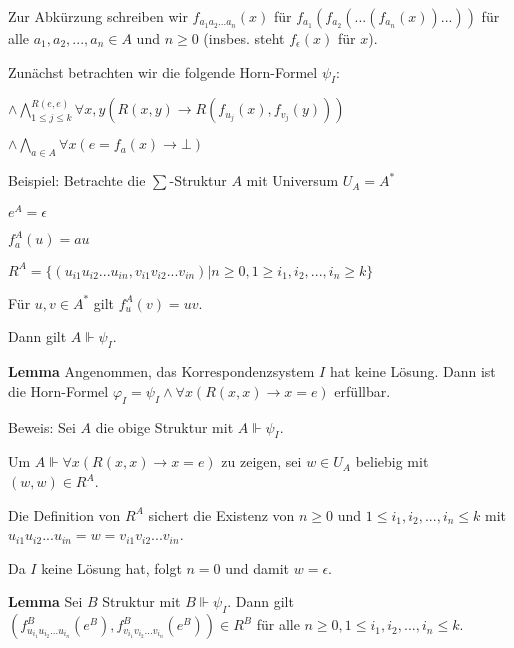 \documentclass[a4paper]{article}
\renewcommand{\note}[2]{\begin{noteBox} \textbf{#1} #2 \end{noteBox}}
\begin{document}
\begin{multicols}{3}
  Zur Abkürzung schreiben wir $f_{a_1 a_2 ...a_n} (x)$ für $f_{a_1}(f_{a_2}(...(f_{a_n}(x))...))$ für alle $a_1,a_2,...,a_n\in A$ und $n\geq 0$ (insbes. steht $f_{\epsilon}(x)$ für $x$).

  Zunächst betrachten wir die folgende Horn-Formel $\psi_I$:
  \begin{itemize*}
    \item $\wedge \bigwedge_{1\leq j \leq k}^{R(e,e)} \forall x,y(R(x,y)\rightarrow R(f_{u_j}(x),f_{v_j}(y)))$
    \item $\wedge \bigwedge_{a\in A} \forall x(e=f_a(x)\rightarrow \bot)$
  \end{itemize*}

  Beispiel: Betrachte die $\sum$-Struktur $A$ mit Universum $U_A=A^*$
  \begin{itemize*}
    \item $e^A=\epsilon$
    \item $f_a^A(u) =au$
    \item $R^A=\{(u_{i1} u_{i2} ...u_{in},v_{i1} v_{i2} ...v_{in})|n\geq 0 , 1\geq i_1,i_2,...,i_n\geq k\}$
    \item Für $u,v\in A^*$ gilt $f_u^A(v) =uv$.
    \item Dann gilt $A\Vdash \psi_I$.
  \end{itemize*}

  \note{Lemma}{Angenommen, das Korrespondenzsystem $I$ hat keine Lösung. Dann ist die Horn-Formel $\varphi_I=\psi_I \wedge \forall x(R(x,x)\rightarrow x=e)$ erfüllbar.}

  Beweis: Sei $A$ die obige Struktur mit $A\Vdash\psi_I$.
  \begin{itemize*}
    \item Um $A\Vdash\forall x(R(x,x)\rightarrow x=e)$ zu zeigen, sei $w\in U_A$ beliebig mit $(w,w)\in R^A$.
    \item Die Definition von $R^A$ sichert die Existenz von $n\geq 0$ und $1\leq i_1,i_2,...,i_n\leq k$ mit $u_{i1} u_{i2}...u_{in}=w=v_{i1} v_{i2} ...v_{in}$.
    \item Da $I$ keine Lösung hat, folgt $n=0$ und damit $w=\epsilon$.
  \end{itemize*}

  \note{Lemma}{Sei $B$ Struktur mit $B\Vdash\psi_I$. Dann gilt $(f_{u_{i_1} u_{i_2} ...u_{i_n}}^B (e^B),f_{v_{i_1} v_{i_2}...v_{i_n}}^B(e^B))\in R^B$ für alle $n\geq 0, 1\leq i_1,i_2,...,i_n \leq k$.}


\end{multicols}
\end{document}
